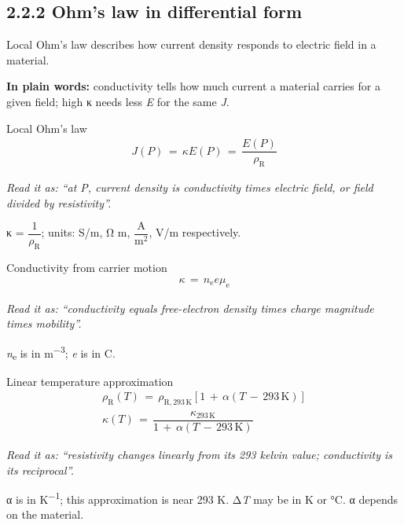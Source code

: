 \documentclass[11pt]{article}
\begin{document}
\begin{keepsection}
\section{2.2.2 Ohm’s law in differential form}

Local Ohm’s law describes how current density responds to electric field in a material.

\begin{plainbox}\textbf{In plain words:} conductivity tells how much current a material carries for a given field; high κ needs less \textit{E} for the same \textit{J}.\end{plainbox}

\begin{equationcard}{Local Ohm’s law}
\[ \begin{gathered} {J}({P})\, =\, κ{E}({P})\, =\, \dfrac{{E}({P})}{ρ_{\mathrm{R}}} \end{gathered} \]
{\small \emph{Read it as: “at P, current density is conductivity times electric field, or field divided by resistivity”.}\par κ = {\small\ensuremath{\dfrac{1}{ρ_{\mathrm{R}}}}}; units: S/m, Ω m, {\small\ensuremath{\dfrac{\mathrm{A}}{\mathrm{m}^{2}}}}, V/m respectively.}
\end{equationcard}

\begin{equationcard}{Conductivity from carrier motion}
\[ \begin{gathered} κ\, =\, {n}_{\mathrm{e}}{e}μ_{\mathrm{e}} \end{gathered} \]
{\small \emph{Read it as: “conductivity equals free-electron density times charge magnitude times mobility”.}\par \textit{n}\textsubscript{e} is in m\textsuperscript{\ensuremath{-}3}; \textit{e} is in C.}
\end{equationcard}

\begin{equationcard}{Linear temperature approximation}
\[ \begin{gathered} ρ_{\mathrm{R}}({T})\, =\, ρ_{\mathrm{R},293\, \mathrm{K}}[1\, +\, α({T}\, -\, 293\, \mathrm{K})] \\ κ({T})\, =\, \dfrac{κ_{293\, \mathrm{K}}}{1\, +\, α({T}\, -\, 293\, \mathrm{K})} \end{gathered} \]
{\small \emph{Read it as: “resistivity changes linearly from its 293 kelvin value; conductivity is its reciprocal”.}\par α is in K\textsuperscript{\ensuremath{-}1}; this approximation is near 293 K. Δ\textit{T} may be in K or °C. α depends on the material.}
\end{equationcard}


\end{keepsection}
\end{document}
